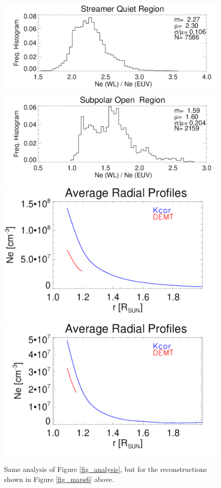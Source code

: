 \begin{figure}[!h]
  \centering
  \includegraphics[width=\columnwidth]{comparison_KCOR-Tom_vs_DEMT_CR2198_h_l799_reduced_kcor_1e4_newgrid-Quiet-region1_ratio_range1105-1195_Rsun.pdf}
  \includegraphics[width=\columnwidth]{comparison_KCOR-Tom_vs_DEMT_CR2198_h_l799_reduced_kcor_1e4_newgrid-Open-region_N_ratio_range1105-1155_Rsun.pdf}\\
  \includegraphics[width=0.75\columnwidth]{Average_Radial_Profiles_KCOR-Tom_vs_DEMT_CR2198_h_l799_reduced_kcor_1e4_newgrid-Quiet-region1.pdf}
  \hskip 2cm
  \includegraphics[width=0.75\columnwidth]{Average_Radial_Profiles_KCOR-Tom_vs_DEMT_CR2198_h_l799_reduced_kcor_1e4_newgrid-Open-region_N.pdf}
  \caption{Same analysis of Figure \ref{fig_analysis}, but for the reconstructions shown in Figure \ref{fig_maps6} above.}
  \label{fig_analysis6}
\end{figure}
